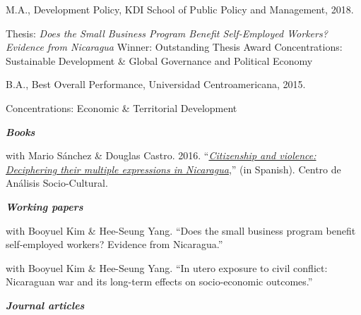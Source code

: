 \documentclass[11pt,article,oneside, a4paper]{memoir}
\begin{document}
\ind M.A., Development Policy, KDI School of Public Policy and Management, 2018. 

\ind \hspace{0.35in} \footnotesize Thesis: \emph{Does the Small Business Program Benefit Self-Employed Workers? Evidence from Nicaragua} \newline Winner: Outstanding Thesis Award \newline Concentrations: Sustainable Development \& Global Governance and Political Economy \normalsize \vspace{0.01in}

\ind B.A., Best Overall Performance, Universidad Centroamericana, 2015.

\ind \hspace{0.35in} \footnotesize Concentrations: Economic \& Territorial Development \normalsize \vspace{0.01in}

\bigskip
\medskip
\noindent\emph{\textbf{Books} \vspace{0.01in}}

\ind with Mario Sánchez \& Douglas Castro. 2016. ``\emph{\href{http://biblioteca.clacso.edu.ar/Nicaragua/casc-uca/20150313124733/Ciudadania-y-violencia.pdf}{Citizenship and violence: Deciphering their multiple expressions in Nicaragua}},'' (in Spanish). Centro de Análisis Socio-Cultural. \vspace{0.05in} \normalsize

\medskip
\noindent\emph{\textbf{Working papers} \vspace{0.05in}}

\ind with Booyuel Kim \& Hee-Seung Yang. ``Does the small business program benefit self-employed workers? Evidence from Nicaragua.''

\ind with Booyuel Kim \& Hee-Seung Yang. ``In utero exposure to civil conflict: Nicaraguan war and its long-term effects on socio-economic outcomes.''

\medskip
\noindent\emph{\textbf{Journal articles} \vspace{0.05in}}
 
\end{document}
